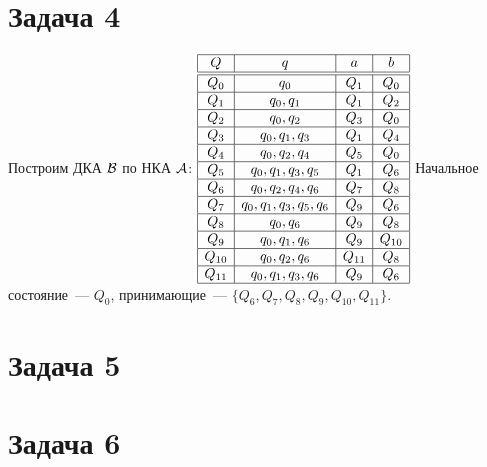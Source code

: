 \documentclass[a4paper]{article}
\def\A{{\cal A}}
\def\B{{\cal B}}
\begin{document}
\section*{Задача 4}
Построим ДКА $\B$ по НКА $\A$:\newline
$\begin{array}{|c|c|c|c|}
\hline
Q & q & a & b\\\hline\hline
Q_0 & q_0						& Q_1  & Q_0 \\\hline
Q_1 & q_0, q_1					& Q_1  & Q_2 \\\hline
Q_2 & q_0, q_2					& Q_3  & Q_0 \\\hline
Q_3 & q_0, q_1, q_3				& Q_1  & Q_4 \\\hline
Q_4 & q_0, q_2, q_4				& Q_5  & Q_0 \\\hline
Q_5 & q_0, q_1, q_3, q_5		& Q_1  & Q_6 \\\hline
Q_6 & q_0, q_2, q_4, q_6		& Q_7  & Q_8 \\\hline
Q_7 & q_0, q_1, q_3, q_5, q_6	& Q_9  & Q_6 \\\hline
Q_8 & q_0, q_6					& Q_9  & Q_8 \\\hline
Q_9 & q_0, q_1, q_6				& Q_9  & Q_{10}\\\hline
Q_{10} & q_0, q_2, q_6				& Q_{11} & Q_8 \\\hline
Q_{11} & q_0, q_1, q_3, q_6		& Q_9  & Q_6 \\\hline
\end{array}$
\newline
Начальное состояние~--- $Q_0$, принимающие~--- $\{Q_6, Q_7, Q_8, Q_9, Q_{10}, Q_{11}\}$.
\section*{Задача 5}
\section*{Задача 6}
\newpage
\end{document}
